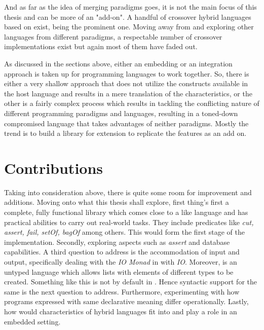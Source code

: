 \documentclass[proposal.tex]{subfiles}
\begin{document}
\par And as far as the idea of merging paradigms goes, it is not the main focus of this thesis and can be more of an "add-on". A handful of crossover hybrid 
languages based on  exist,  \cite{website:curry} being the prominent one. Moving away from  
and exploring other languages from different paradigms, a respectable number of crossover implementations exist but again most of them have faded out.   

\par As discussed in the sections above, either an embedding or an integration approach is taken up for programming languages to work together. 
So, there is either a very shallow approach that does not utilize the constructs available in the host language and results in a mere translation of the 
characteristics, or the other is a fairly complex process which results in tackling the conflicting nature of different programming paradigms and 
languages, resulting in a toned-down  compromised language that takes advantages of neither paradigms. Mostly the trend is to build a library for 
extension to replicate the features as an add on.       

\section{Contributions}

Taking into consideration above, there is quite some room for improvement and additions. Moving onto what this thesis shall explore, first 
thing's first a complete, fully functional library which comes close to a  like language and has practical abilities to 
carry out real-world tasks. They include predicates like \textit{cut, assert, fail, setOf, bagOf} among others. This would form the first 
stage of the implementation. Secondly, exploring aspects such as \textit{assert} and database capabilities. A third question to address is 
the accommodation of input and output, specifically dealing with the \textit{IO Monad} in  with  
\textit{IO}. Moreover,  is an untyped language which allows lists with elements of different types to be created. 
Something like this is not by default in . Hence syntactic support for the same is the next question to address. 
Furthermore, experimenting with how programs expressed with same declarative meaning differ operationally. Lastly, how would 
characteristics of hybrid languages fit into and play a role in an embedded setting.  
\end{document}
